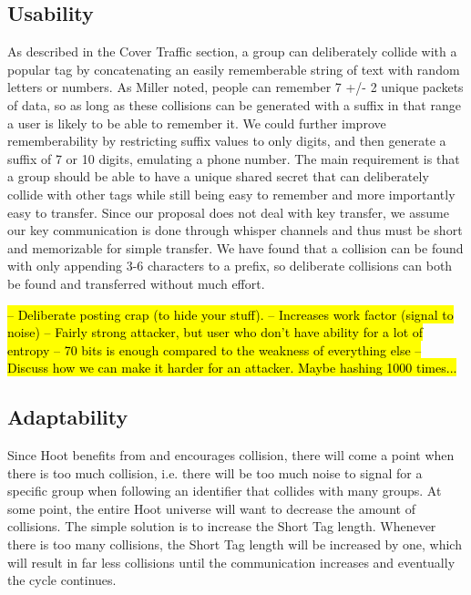 \subsection{Usability}

As described in the Cover Traffic section, a group can deliberately collide with a popular tag by concatenating an easily rememberable string of text with random letters or numbers. As Miller\cite{miller56} noted, people can remember  
7 +/- 2 unique packets of data, so as long as these collisions can be generated with a suffix in that range a user is likely to be able to remember it. We could further improve rememberability by restricting suffix values to only digits, and then generate a suffix of 7 or 10 digits, emulating a phone number. The main requirement is that a group should be able to have a unique shared secret that can deliberately collide with other tags while still being easy to remember and more importantly easy to transfer. Since our proposal does not deal with key transfer, we assume our key communication is done through whisper channels and thus must be short and memorizable for simple transfer. We have found that a collision can be found with only appending 3-6 characters to a prefix, so deliberate collisions can both be found and transferred without much effort.

\hl{
-- Deliberate posting crap (to hide your stuff).
-- Increases work factor (signal to noise)
-- Fairly strong attacker, but user who don't have ability for a lot of entropy
-- 70 bits is enough compared to the weakness of everything else
-- Discuss how we can make it harder for an attacker. Maybe hashing 1000 times...
}



\subsection{Adaptability}

Since Hoot benefits from and encourages collision, there will come a point when there is too much collision, i.e. there will be too much noise to signal for a specific group when following an identifier that collides with many groups. At some point, the entire Hoot universe will want to decrease the amount of collisions. The simple solution is to increase the Short Tag length. Whenever there is too many collisions, the Short Tag length will be increased by one, which will result in far less collisions until the communication increases and eventually the cycle continues. 

